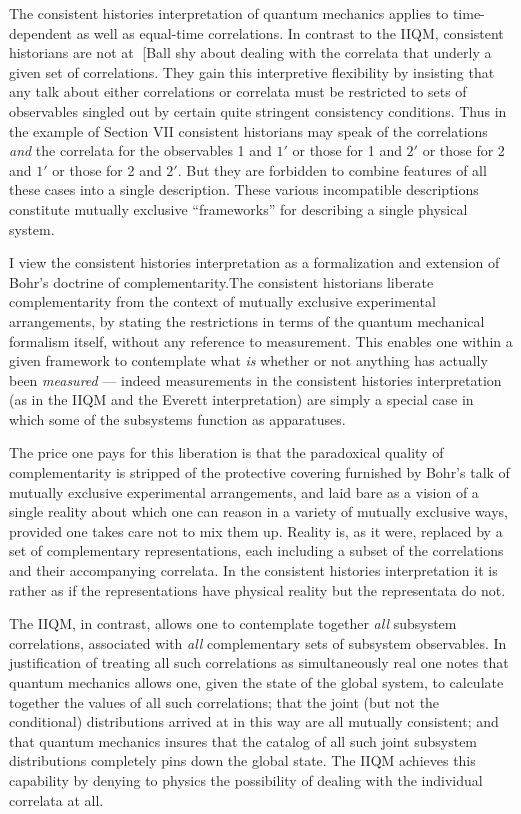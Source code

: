 The consistent histories interpretation of quantum mechanics applies
to time-depend\-ent as well as equal-time correlations.  In contrast to
the IIQM, consistent historians are not at [Ball shy about dealing with
the correlata that underly a given set of correlations.  They gain
this interpretive flexibility by insisting that any talk about either
correlations or correlata must be restricted to sets of observables
singled out by certain quite stringent consistency conditions.  Thus
in the example of Section VII consistent historians may speak of
the correlations {\it and\/} the correlata for the observables 1 and
$1'$ or those for 1 and $2'$ or those for 2 and $1'$ or those for 2
and $2'$.  But they are forbidden to combine features of all these cases
into a single description.  These various incompatible descriptions
constitute mutually exclusive ``frameworks'' for describing a single
physical system.

I view the consistent histories interpretation as a formalization and
extension of Bohr's doctrine of complementarity.\fn The consistent
historians liberate complementarity from the context of
mutually exclusive experimental arrangements, by stating the
restrictions in terms of the quantum mechanical formalism itself,
without any reference to measurement.  This enables one within a given
framework to contemplate what {\it is\/} whether or not anything has
actually been {\it measured\/} --- indeed measurements in the
consistent histories interpretation (as in the IIQM and the Everett
interpretation) are simply a special case in which some of the
subsystems function as apparatuses.

The price one pays for this liberation is that the paradoxical quality
of complementarity is stripped of the protective covering furnished by
Bohr's talk of mutually exclusive experimental arrangements, and laid
bare as a vision of a single reality about which one can reason in a
variety of mutually exclusive ways, provided one takes care not to mix
them up.  Reality is, as it were, replaced by a set of complementary
representations, each including a subset of the correlations and their
accompanying correlata.  In the consistent histories interpretation it
is rather as if the representations have physical reality but the
representata do not.

The IIQM, in contrast, allows one to contemplate together {\it all\/}
subsystem correlations, associated with {\it all\/} complementary sets
of subsystem observables.  In justification of treating all such
correlations as simultaneously real one notes that quantum mechanics
allows one, given the state of the global system, to calculate
together the values of all such correlations; that the joint (but not
the conditional) distributions arrived at in this way are all mutually
consistent; and that quantum mechanics insures that the catalog of all
such joint subsystem distributions completely pins down the global
state.  The IIQM achieves this capability by denying to physics the
possibility of dealing with the individual correlata at all.

